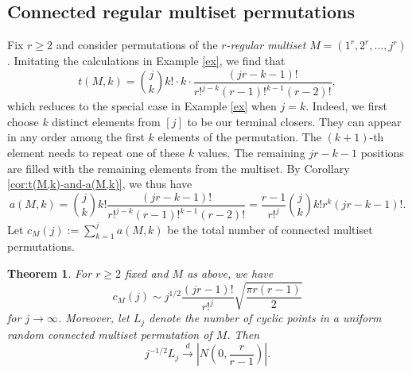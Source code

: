 \documentclass[letterpaper]{amsart}
\theoremstyle{plain}
\newtheorem{theorem}{Theorem}
\theoremstyle{definition}
\theoremstyle{remark}
\newcommand{\dto}{\stackrel{d}{\longrightarrow}}
\begin{document}
\subsection{Connected regular multiset permutations}

Fix $r\geq 2$ and consider permutations of the \emph{$r$-regular multiset} $M=(1^{r},2^{r},\dots,j^{r})$. Imitating the calculations in Example \ref{ex}, we find that
\[
 t(M,k) = \binom{j}{k} k! \cdot k\cdot \frac{(jr-k-1)!}{r!^{j-k}(r-1)!^{k-1}(r-2)!},
\]
which reduces to the special case in Example \ref{ex} when $j=k$.
Indeed, we first choose $k$ distinct elements from $[j]$ to be our terminal closers. They can appear in any order among the first $k$ elements of the permutation. The $(k+1)$-th element needs to repeat one of these $k$ values. The remaining $jr-k-1$ positions are filled with the remaining elements from the multiset. By Corollary \ref{cor:t(M,k)-and-a(M,k)}, we thus have
\begin{equation*}
a(M,k)
 = \binom{j}{k} k! \frac{(jr-k-1)!}{r!^{j-k}(r-1)!^{k-1}(r-2)!}
 = \frac{r-1}{r!^{j}} \binom{j}{k} k! r^k (jr-k-1)!.
\end{equation*}
Let $c_M(j) := \sum_{k=1}^j a(M,k)$ be the total number of connected multiset permutations.

\begin{theorem}\label{thm:regM}
 For $r\geq 2$ fixed and $M$ as above, we have
 \begin{equation}\label{eq:thmregM1}
  c_M(j)
  \sim j^{1/2} \frac{(jr-1)!}{r!^{j}} \sqrt{\frac{\pi r(r-1)}{2}}
 \end{equation}
 for $j\to\infty$. Moreover, let $L_j$ denote the number of cyclic points in a uniform random connected multiset permutation of $M$. Then
 \begin{equation*}
  j^{-1/2} L_j \dto \left|N\left(0,\frac{r}{r-1}\right)\right|.
 \end{equation*}
\end{theorem}
\end{document}
